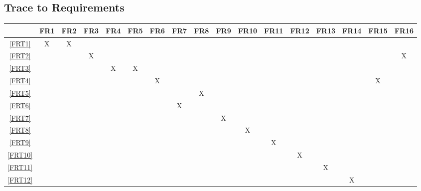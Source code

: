 \documentclass[12pt, titlepage]{article}
\begin{document}
\setlength{\tabcolsep}{2pt}
\begin{landscape}
  \section{Trace to Requirements}
  \begin{table}[h!]
    \centering
    \begin{tabular}{|c|c|c|c|c|c|c|c|c|c|c|c|c|c|c|c|c|} \hline
               & FR1 & FR2 & FR3 & FR4 & FR5 & FR6 & FR7 & FR8 & FR9 & FR10 & FR11 & FR12 & FR13 & FR14 & FR15 & FR16 \\ \hline
      \ref{FRT1}  & X   & X   &     &     &     &     &     &     &     &      &      &      &      &      &      &      \\ \hline
      \ref{FRT2}  &     &     & X   &     &     &     &     &     &     &      &      &      &      &      &      & X    \\ \hline
      \ref{FRT3}  &     &     &     & X   & X   &     &     &     &     &      &      &      &      &      &      &      \\ \hline
      \ref{FRT4}  &     &     &     &     &     & X   &     &     &     &      &      &      &      &      & X    &      \\ \hline
      \ref{FRT5}  &     &     &     &     &     &     &     & X   &     &      &      &      &      &      &      &      \\ \hline
      \ref{FRT6}  &     &     &     &     &     &     & X   &     &     &      &      &      &      &      &      &      \\ \hline
      \ref{FRT7}  &     &     &     &     &     &     &     &     & X   &      &      &      &      &      &      &      \\ \hline
      \ref{FRT8}  &     &     &     &     &     &     &     &     &     & X    &      &      &      &      &      &      \\ \hline
      \ref{FRT9}  &     &     &     &     &     &     &     &     &     &      & X    &      &      &      &      &      \\ \hline
      \ref{FRT10} &     &     &     &     &     &     &     &     &     &      &      & X    &      &      &      &      \\ \hline
      \ref{FRT11} &     &     &     &     &     &     &     &     &     &      &      &      & X    &      &      &      \\ \hline
      \ref{FRT12} &     &     &     &     &     &     &     &     &     &      &      &      &      & X    &      &      \\ \hline

\end{tabular}
\end{table}
\end{landscape}
\end{document}
